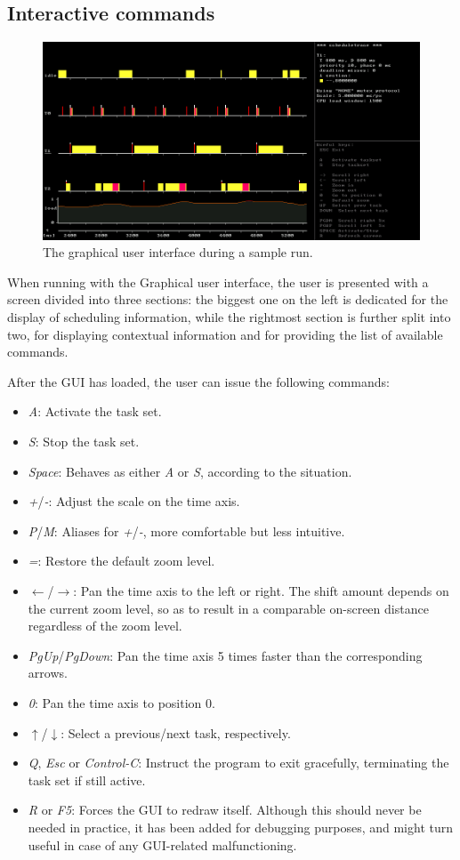 \documentclass[paper=a4, fontsize=11pt]{scrartcl}
\numberwithin{equation}{section}        %
\numberwithin{figure}{section}          %
\numberwithin{table}{section}               %
\numberwithin{fragment}{section}
\begin{document}
\subsection{Interactive commands}

\begin{figure}
  \centering
  \includegraphics[width=.85\textwidth,frame]{img/gui.png}
  \caption{\label{fig:gui} The graphical user interface during a sample run.}
\end{figure}

When running with the Graphical user interface, the user is presented with a screen divided into three sections: the biggest one on the left is dedicated for the display of scheduling information, while the rightmost section is further split into two, for displaying contextual information and for providing the list of available commands.

After the GUI has loaded, the user can issue the following commands:
\begin{itemize}
\item \textit{A}: Activate the task set.
\item \textit{S}: Stop the task set.
\item \textit{Space}: Behaves as either \textit{A} or \textit{S}, according to the situation.
\item \textit{+}/\textit{-}: Adjust the scale on the time axis.
\item \textit{P}/\textit{M}: Aliases for \textit{+}/\textit{-}, more comfortable but less intuitive.
\item \textit{=}: Restore the default zoom level.
\item $\leftarrow$/$\rightarrow$: Pan the time axis to the left or right. The shift amount depends on the current zoom level, so as to result in a comparable on-screen distance regardless of the zoom level.
\item \textit{PgUp}/\textit{PgDown}: Pan the time axis 5 times faster than the corresponding arrows.
\item \textit{0}: Pan the time axis to position 0.
\item $\uparrow$/$\downarrow$: Select a previous/next task, respectively.
\item \textit{Q}, \textit{Esc} or \textit{Control-C}: Instruct the program to exit gracefully, terminating the task set if still active.
\item \textit{R} or \textit{F5}: Forces the GUI to redraw itself. Although this should never be needed in practice, it has been added for debugging purposes, and might turn useful in case of any GUI-related malfunctioning.
\end{itemize}
\end{document}
